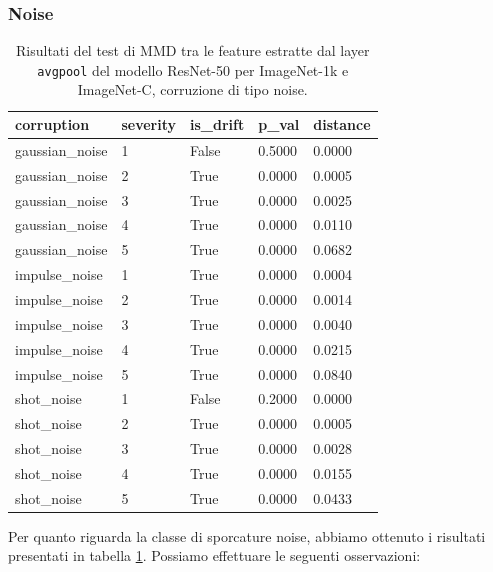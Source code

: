 \subsubsection{Noise}
\begin{table}[H]
  \centering
  \begin{tabular}{lllll}
    \toprule
    corruption & severity & is\_drift & p\_val & distance \\
    \midrule
    gaussian\_noise & 1 & False & 0.5000 & 0.0000 \\ 
    gaussian\_noise & 2 & True & 0.0000 & 0.0005 \\ 
    gaussian\_noise & 3 & True & 0.0000 & 0.0025 \\ 
    gaussian\_noise & 4 & True & 0.0000 & 0.0110 \\ 
    gaussian\_noise & 5 & True & 0.0000 & 0.0682 \\ 
    impulse\_noise & 1 & True & 0.0000 & 0.0004 \\ 
    impulse\_noise & 2 & True & 0.0000 & 0.0014 \\ 
    impulse\_noise & 3 & True & 0.0000 & 0.0040 \\ 
    impulse\_noise & 4 & True & 0.0000 & 0.0215 \\ 
    impulse\_noise & 5 & True & 0.0000 & 0.0840 \\ 
    shot\_noise & 1 & False & 0.2000 & 0.0000 \\ 
    shot\_noise & 2 & True & 0.0000 & 0.0005 \\ 
    shot\_noise & 3 & True & 0.0000 & 0.0028 \\ 
    shot\_noise & 4 & True & 0.0000 & 0.0155 \\ 
    shot\_noise & 5 & True & 0.0000 & 0.0433 \\ 
    \bottomrule
  \end{tabular}
\caption{Risultati del test di MMD tra le feature estratte dal layer \texttt{avgpool} del modello ResNet-50 per ImageNet-1k e ImageNet-C, corruzione di tipo noise.}
\label{tab:mmd_drift_report_imagenet_c_noise}
\end{table}
Per quanto riguarda la classe di sporcature noise, abbiamo ottenuto i risultati presentati in tabella \ref{tab:mmd_drift_report_imagenet_c_noise}. Possiamo effettuare le seguenti osservazioni:
